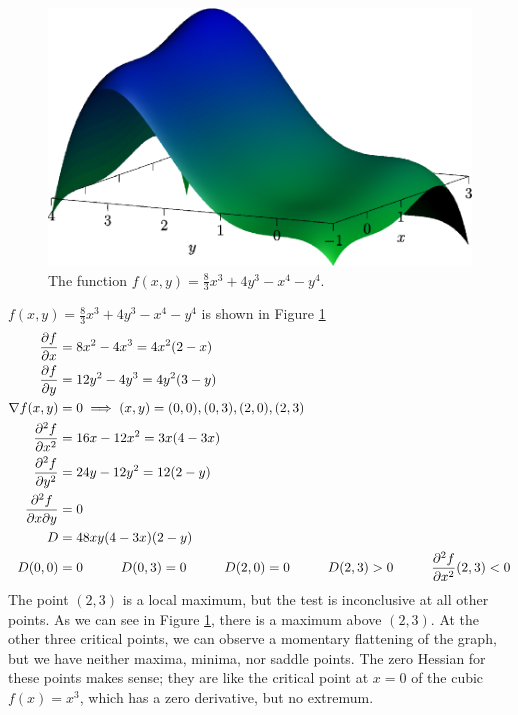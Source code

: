 \documentclass[fleqn,letterpaper]{report}
\begin{document}
\begin{figure}[t]
\centering
\includegraphics[width=12cm]{figure47.eps}
\caption{The function $f(x,y) =\frac{8}{3}x^3 + 4y^3 - x^4 -
y^4$.}
\label{figure-3d-graph9}
\end{figure}

\begin{example}
$f(x,y) = \frac{8}{3} x^3 + 4y^3 - x^4 - y^4$ is shown in
Figure \ref{figure-3d-graph9}
\begin{align*}
\frac{\partial f}{\partial x} & = 8x^2 - 4x^3 = 4x^2 (2-x) \\
\frac{\partial f}{\partial y} & = 12y^2 - 4y^3 = 4y^2 (3-y) \\
\nabla f(x,y) & = 0 \implies (x,y) = (0,0), (0, 3), (2, 0),
(2,3) \\
\frac{\partial^2 f}{\partial x^2} & = 16x - 12x^2 = 3x(4-3x) \\
\frac{\partial^2 f}{\partial y^2} & = 24y - 12y^2 = 12(2-y) \\
\frac{\partial^2 f}{\partial x \partial y} & = 0 \\
D & = 48xy (4-3x)(2-y)\\
D(0,0) & = 0 \hspace{1cm}
D(0,3) = 0 \hspace{1cm}
D(2,0) = 0 \hspace{1cm}
D(2,3) > 0 \hspace{1cm}
\frac{\partial^2 f}{\partial x^2} (2,3) < 0 
\end{align*}
The point $(2,3)$ is a local maximum, but the test
is inconclusive at all other points. As we can see in Figure
\ref{figure-3d-graph9}, there is a maximum above $(2,3)$. At the other
three critical points, we can observe a momentary flattening
of the graph, but we have neither maxima, minima, nor saddle
points. The zero Hessian for these points makes sense; they
are like the critical point at $x=0$ of the cubic $f(x) =
x^3$, which has a zero derivative, but no extremum.
\end{example}
\end{document}
